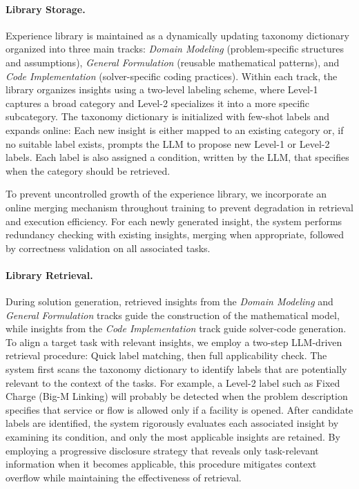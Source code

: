 \documentclass[sigconf, nonacm]{acmart}
\begin{document}
\paragraph{\textbf{Library Storage.}}
Experience library is maintained as a dynamically updating taxonomy dictionary organized into three main tracks: \emph{Domain Modeling} (problem-specific structures and assumptions), \emph{General Formulation} (reusable mathematical patterns), and \emph{Code Implementation} (solver-specific coding practices). Within each track, the library organizes insights using a two-level labeling scheme, where Level-1 captures a broad category and Level-2 specializes it into a more specific subcategory. The taxonomy dictionary is initialized with few-shot labels and expands online: Each new insight is either mapped to an existing category or, if no suitable label exists, prompts the LLM to propose new Level-1 or Level-2 labels. Each label is also assigned a condition, written by the LLM, that specifies when the category should be retrieved. 

To prevent uncontrolled growth of the experience library, we incorporate an online merging mechanism throughout training to prevent degradation in retrieval and execution efficiency. For each newly generated insight, the system performs redundancy checking with existing insights, merging when appropriate, followed by correctness validation on all associated tasks.

\paragraph{\textbf{Library Retrieval.}}
During solution generation, retrieved insights from the \emph{Domain Modeling} and \emph{General Formulation} tracks guide the construction of the mathematical model, while insights from the \emph{Code Implementation} track guide solver-code generation. To align a target task with relevant insights, we employ a two-step LLM-driven retrieval procedure: Quick label matching, then full applicability check. The system first scans the taxonomy dictionary to identify labels that are potentially relevant to the context of the tasks. For example, a Level-2 label such as Fixed Charge (Big-M Linking) will probably be detected when the problem description specifies that service or flow is allowed only if a facility is opened. After candidate labels are identified, the system rigorously evaluates each associated insight by examining its condition, and only the most applicable insights are retained. By employing a progressive disclosure strategy that reveals only task-relevant information when it becomes applicable, this procedure mitigates context overflow while maintaining the effectiveness of retrieval.
\end{document}
